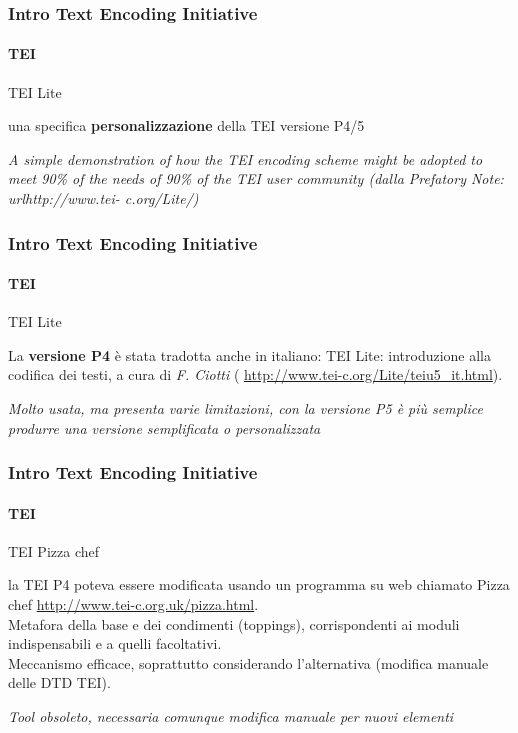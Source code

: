 \begin{frame}
	\frametitle{Intro Text Encoding Initiative}
	\framesubtitle{TEI}
	\addtocounter{nframe}{1}

	\begin{block}{TEI Lite}

		una specifica \textbf{personalizzazione} della TEI versione P4/5

	\end{block}

	\textit{A simple demonstration of how the TEI encoding scheme
		might be adopted to meet 90\% of the needs of 90\% of the
		TEI user community (dalla Prefatory Note: \\url{http://www.tei-
		c.org/Lite/})}

\end{frame}


\begin{frame}
	\frametitle{Intro Text Encoding Initiative}
	\framesubtitle{TEI}
	\addtocounter{nframe}{1}

	\begin{block}{TEI Lite}

		La \textbf{versione P4} è stata tradotta anche in italiano: TEI Lite:
		introduzione alla codifica dei testi, a cura di \textit{F. Ciotti} (
		\url{http://www.tei-c.org/Lite/teiu5_it.html}).
    \end{block}
    \textit{Molto usata, ma presenta varie limitazioni, con la versione P5 è più semplice produrre una versione semplificata o personalizzata}
\end{frame}

\begin{frame}
	\frametitle{Intro Text Encoding Initiative}
	\framesubtitle{TEI}
	\addtocounter{nframe}{1}

	\begin{block}{TEI Pizza chef}

		la TEI P4 poteva essere modificata usando un programma su
		web chiamato Pizza chef
		\url{http://www.tei-c.org.uk/pizza.html}.
		\\Metafora della base e dei condimenti (toppings),
		corrispondenti ai moduli indispensabili e a quelli facoltativi.
		\\Meccanismo efficace, soprattutto considerando l’alternativa
		(modifica manuale delle DTD TEI).
    \end{block}
    
    \textit{Tool obsoleto, necessaria comunque modifica manuale per nuovi elementi}


\end{frame}

